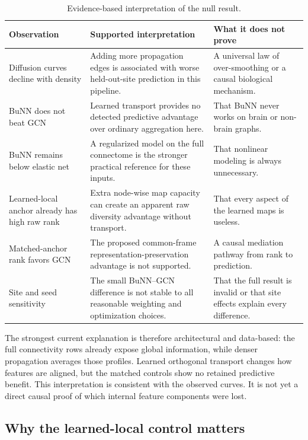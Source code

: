 \documentclass[11pt,a4paper]{article}
\begin{document}
\begin{table}[htbp]
\centering
\caption{Evidence-based interpretation of the null result.}
\label{tab:explanation}
\small
\begin{tabularx}{\textwidth}{@{}p{3.1cm}Y Y@{}}
\toprule
\textbf{Observation} & \textbf{Supported interpretation} & \textbf{What it does not prove} \\
\midrule
Diffusion curves decline with density & Adding more propagation edges is associated with worse held-out-site prediction in this pipeline. & A universal law of over-smoothing or a causal biological mechanism. \\
BuNN does not beat GCN & Learned transport provides no detected predictive advantage over ordinary aggregation here. & That BuNN never works on brain or non-brain graphs. \\
BuNN remains below elastic net & A regularized model on the full connectome is the stronger practical reference for these inputs. & That nonlinear modeling is always unnecessary. \\
Learned-local anchor already has high raw rank & Extra node-wise map capacity can create an apparent raw diversity advantage without transport. & That every aspect of the learned maps is useless. \\
Matched-anchor rank favors GCN & The proposed common-frame representation-preservation advantage is not supported. & A causal mediation pathway from rank to prediction. \\
Site and seed sensitivity & The small BuNN--GCN difference is not stable to all reasonable weighting and optimization choices. & That the full result is invalid or that site effects explain every difference. \\
\bottomrule
\end{tabularx}
\end{table}

The strongest current explanation is therefore architectural and data-based:
the full connectivity rows already expose global information, while denser
propagation averages those profiles. Learned orthogonal transport changes how
features are aligned, but the matched controls show no retained predictive
benefit. This interpretation is consistent with the observed curves. It is
not yet a direct causal proof of which internal feature components were lost.

\subsection{Why the learned-local control matters}
\end{document}
